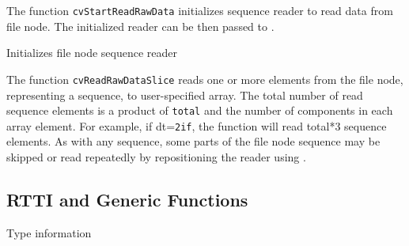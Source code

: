 \begin{description}
\end{description}

The function \texttt{cvStartReadRawData} initializes sequence reader to read data from file node. The initialized reader can be then passed to .

\label{ReadRawDataSlice}

Initializes file node sequence reader


\begin{description}
\end{description}

The function \texttt{cvReadRawDataSlice} reads one or more elements from
the file node, representing a sequence, to user-specified array. The
total number of read sequence elements is a product of \texttt{total}
and the number of components in each array element. For example, if
dt=\texttt{2if}, the function will read total*3 sequence elements. As
with any sequence, some parts of the file node sequence may be skipped or
read repeatedly by repositioning the reader using .

\subsection{RTTI and Generic Functions}

\label{CvTypeInfo}

Type information

